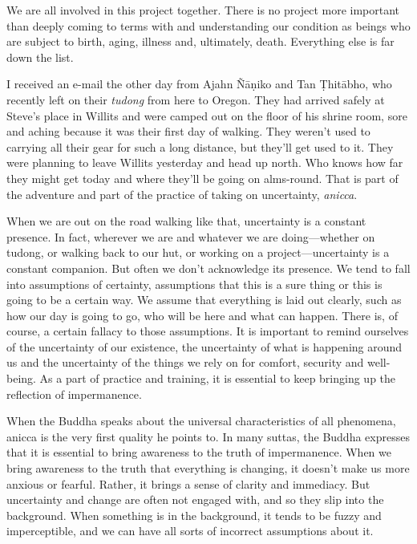 We are all involved in this project together. There is no project more 
important than deeply coming to terms with and understanding our 
condition as beings who are subject to birth, aging, illness and, 
ultimately, death. Everything else is far down the list.


I received an e-mail the other day from Ajahn Ñāṇiko and Tan 
Ṭhitābho, who recently left on their \emph{tudong} from here to 
Oregon. They had arrived safely at Steve's place in Willits and were 
camped out on the floor of his shrine room, sore and aching because it 
was their first day of walking. They weren't used to carrying all their 
gear for such a long distance, but they'll get used to it. They were 
planning to leave Willits yesterday and head up north. Who knows how 
far they might get today and where they'll be going on alms-round. That 
is part of the adventure and part of the practice of taking on 
uncertainty, \emph{anicca}.

When we are out on the road walking like that, uncertainty is a 
constant presence. In fact, wherever we are and whatever we are 
doing---whether on tudong, or walking back to our hut, or working on a 
project---uncertainty is a constant companion. But often we don't 
acknowledge its presence. We tend to fall into assumptions of 
certainty, assumptions that this is a sure thing or this is going to be 
a certain way. We assume that everything is laid out clearly, such as 
how our day is going to go, who will be here and what can happen. There 
is, of course, a certain fallacy to those assumptions. It is important 
to remind ourselves of the uncertainty of our existence, the 
uncertainty of what is happening around us and the uncertainty of the 
things we rely on for comfort, security and well-being. As a part of 
practice and training, it is essential to keep bringing up the 
reflection of impermanence.

When the Buddha speaks about the universal characteristics of all 
phenomena, anicca is the very first quality he points to. In many 
suttas, the Buddha expresses that it is essential to bring awareness to 
the truth of impermanence. When we bring awareness to the truth that 
everything is changing, it doesn't make us more anxious or fearful. 
Rather, it brings a sense of clarity and immediacy. But uncertainty and 
change are often not engaged with, and so they slip into the 
background. When something is in the background, it tends to be fuzzy 
and imperceptible, and we can have all sorts of incorrect assumptions 
about it.

